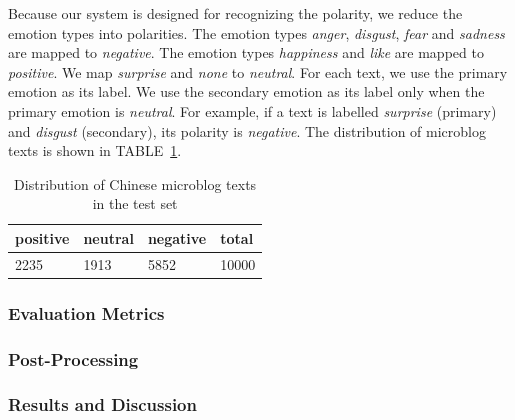 Because our system is designed for recognizing the polarity, we reduce the emotion types into polarities. The emotion types {\it anger}, {\it disgust}, {\it fear} and {\it sadness} are mapped to {\it negative}. The emotion types {\it happiness} and {\it like} are mapped to {\it positive}. We map {\it surprise} and {\it none} to {\it neutral}. For each text, we use the primary emotion as its label. We use the secondary emotion as its label only when the primary emotion is {\it neutral}. For example, if a text is labelled {\it surprise} (primary) and {\it disgust} (secondary), its polarity is {\it negative}. The distribution of microblog texts is shown in TABLE~\ref{table:microblogDist}.

\begin{table}[]
\centering
\caption{Distribution of Chinese microblog texts in the test set}
\label{table:microblogDist}
\begin{tabular}{|l|l|l|l|}
\hline
positive & neutral & negative & total \\ \hline
2235 & 1913 & 5852 & 10000  \\ \hline
\end{tabular}
\end{table} 

\subsubsection{Evaluation Metrics}

\subsubsection{Post-Processing}


\subsubsection{Results and Discussion}


